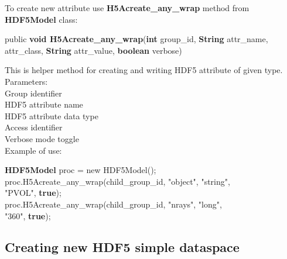 \documentclass[11p]{article}
\begin{document}
To create new attribute use {\bf H5Acreate\_any\_wrap} method from {\bf
HDF5Model} class:
\begin{kod}
public {\bf void H5Acreate\_any\_wrap}({\bf int} group\_id, {\bf String} attr\_name,\\
\hspace*{0.5cm}{\bf String} attr\_class, {\bf String} attr\_value, {\bf boolean}
            verbose)
\end{kod}
This is helper method for creating and writing HDF5 attribute of given type.\\
Parameters:\\
\hspace*{0.5cm}{\bf group\_id} Group identifier\\
\hspace*{0.5cm}{\bf attr\_name} HDF5 attribute name\\
\hspace*{0.5cm}{\bf attr\_class} HDF5 attribute data type\\
\hspace*{0.5cm}{\bf attr\_value} Access identifier\\
\hspace*{0.5cm}{\bf verbose} Verbose mode toggle\\

Example of use:
\begin{kod}
{\bf HDF5Model} proc = new HDF5Model();\\
proc.H5Acreate\_any\_wrap(child\_group\_id, "object", "string",\\
\hspace*{0.5cm}"PVOL", {\bf true});\\
proc.H5Acreate\_any\_wrap(child\_group\_id, "nrays", "long",\\
\hspace*{0.5cm} "360", {\bf true});
\end{kod}

\subsection{Creating new HDF5 simple dataspace}
\end{document}
